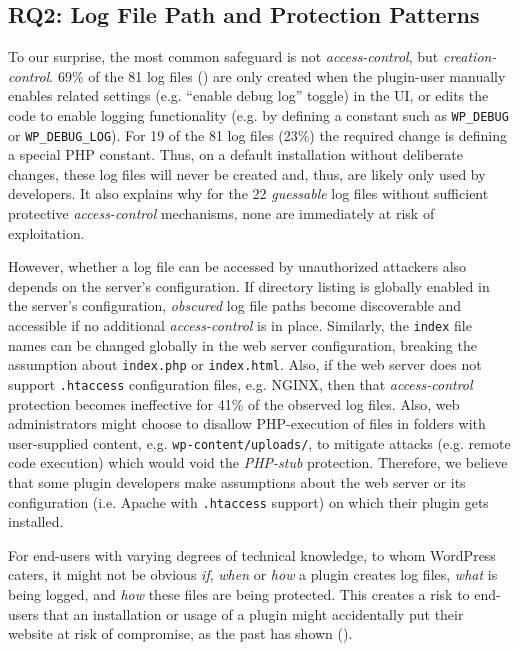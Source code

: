 \documentclass[sigconf]{acmart}
\begin{document}
\subsection{RQ2: Log File Path and Protection Patterns}
To our surprise, the most common safeguard is not \emph{access-control}, but \emph{creation-control}. 69\% of the 81 log files () are only created when the plugin-user manually enables related settings (e.g. ``enable debug log'' toggle) in the UI, or edits the code to enable logging functionality (e.g. by defining a constant such as \texttt{WP\_DEBUG} or \texttt{WP\_DEBUG\_LOG}). For 19 of the 81 log files (23\%) the required change is defining a special PHP constant. Thus, on a default installation without deliberate changes, these log files will never be created and, thus, are likely only used by developers.
It also explains why for the 22 \emph{guessable} log files without sufficient protective \emph{access-control} mechanisms, none are immediately at risk of exploitation.

However, whether a log file can be accessed by unauthorized attackers also depends on the server's configuration. If directory listing is globally enabled in the server's configuration, \emph{obscured} log file paths become discoverable and accessible if no additional \emph{access-control} is in place. 
Similarly, the \texttt{index} file names can be changed globally in the web server configuration, breaking the assumption about \texttt{index.php} or \texttt{index.html}.
Also, if the web server does not support \texttt{.htaccess} configuration files, e.g. NGINX, then that \emph{access-control} protection becomes ineffective for 41\% of the observed log files. 
Also, web administrators might choose to disallow PHP-execution of files in folders with user-supplied content, e.g. \texttt{wp-content/uploads/}, to mitigate attacks (e.g. remote code execution) which would void the \emph{PHP-stub} protection.
Therefore, we believe that some plugin developers make assumptions about the web server or its configuration (i.e. Apache with \texttt{.htaccess} support) on which their plugin gets installed.

For end-users with varying degrees of technical knowledge, to whom WordPress caters, it might not be obvious \emph{if}, \emph{when} or \emph{how} a plugin creates log files, \emph{what} is being logged, and \emph{how} these files are being protected. This creates a risk to end-users that an installation or usage of a plugin might accidentally put their website at risk of compromise, as the past has shown (\cite{easywpsmtp0day,postsmtp0day}).
\end{document}
